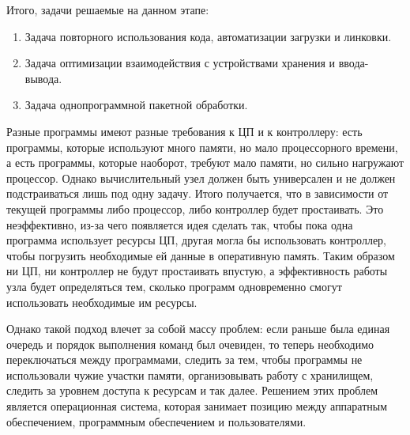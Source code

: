Итого, задачи решаемые на данном этапе:

\begin{enumerate}
\item
  Задача повторного использования кода, автоматизации загрузки и линковки.

\item
  Задача оптимизации взаимодействия с устройствами хранения и ввода-вывода.

\item
  Задача однопрограммной пакетной обработки.  
\end{enumerate}


Разные программы имеют разные требования к ЦП и к контроллеру: есть программы,
которые используют много памяти, но мало процессорного времени, а есть
программы, которые наоборот, требуют мало памяти, но сильно нагружают процессор.
Однако вычислительный узел должен быть универсален и не должен подстраиваться
лишь под одну задачу. Итого получается, что в зависимости от текущей программы
либо процессор, либо контроллер будет простаивать. Это неэффективно, из-за чего
появляется идея сделать так, чтобы пока одна программа использует ресурсы ЦП,
другая могла бы использовать контроллер, чтобы погрузить необходимые ей данные в
оперативную память. Таким образом ни ЦП, ни контроллер не будут простаивать
впустую, а эффективность работы узла будет определяться тем, сколько программ
одновременно смогут использовать необходимые им ресурсы.

Однако такой подход влечет за собой массу проблем: если раньше была единая
очередь и порядок выполнения команд был очевиден, то теперь необходимо
переключаться между программами, следить за тем, чтобы программы не использовали
чужие участки памяти, организовывать работу с хранилищем, следить за уровнем
доступа к ресурсам и так далее. Решением этих проблем является операционная
система, которая занимает позицию между аппаратным обеспечением, программным
обеспечением и пользователями.
